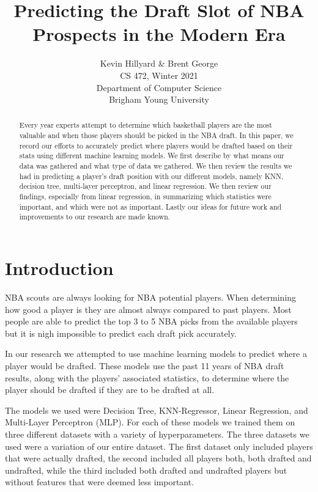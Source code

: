 \documentclass{article}
\title{Predicting the Draft Slot of NBA Prospects in the Modern Era}
\author{Kevin Hillyard \& Brent George \\
CS 472, Winter 2021 \\
Department of Computer Science\\
Brigham Young University}
\begin{document}
\maketitle

\begin{abstract}
  Every year experts attempt to determine which basketball players are the most
  valuable and when those players should be picked in the NBA draft. In this
  paper, we record our efforts to accurately predict where players would be
  drafted based on their stats using different machine learning models. We first
  describe by what means our data was gathered and what type of data we
  gathered. We then review the results we had in predicting a player’s draft
  position with our different models, namely KNN, decision tree, multi-layer
  perceptron, and linear regression. We then review our findings, especially
  from linear regression, in summarizing which statistics were important, and
  which were not as important. Lastly our ideas for future work and improvements
  to our research are made known.
\end{abstract}

\section{Introduction}

NBA scouts are always looking for NBA potential players. When determining how
good a player is they are almost always compared to past players. Most people
are able to predict the top 3 to 5 NBA picks from the available players but it
is nigh impossible to predict each draft pick accurately. 

In our research we attempted to use machine learning models to predict where a
player would be drafted. These models use the past 11 years of NBA draft
results, along with the players’ associated statistics, to determine where the
player should be drafted if they are to be drafted at all.

The models we used were Decision Tree, KNN-Regressor, Linear Regression, 
and Multi-Layer Perceptron (MLP). For each of these models we trained them on three 
different datasets with a variety of hyperparameters. The three datasets we used were 
a variation of our entire dataset. The first dataset only included players that were actually 
drafted, the second included all players both, both drafted and undrafted, while the third included 
both drafted and undrafted players but without features that were deemed less important.
\end{document}

